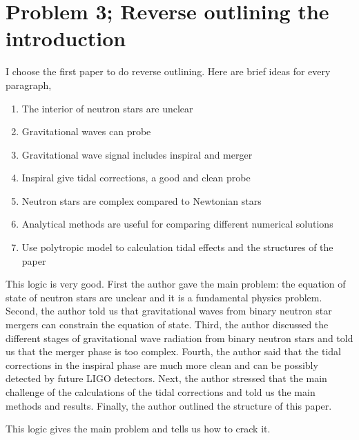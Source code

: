 \documentclass[12pt]{article}
\begin{document}
\section{Problem 3; Reverse outlining the introduction}
I choose the first paper to do reverse outlining. Here are brief ideas for every paragraph,
\begin{enumerate}
    \item The interior of neutron stars are unclear
    \item Gravitational waves can probe 
    \item Gravitational wave signal includes inspiral and merger
    \item Inspiral give tidal corrections, a good and clean probe
    \item Neutron stars are complex compared to Newtonian stars
    \item Analytical methods are useful for comparing different numerical solutions
    \item Use polytropic model to calculation tidal effects and the structures of the paper
\end{enumerate}

\quad This logic is very good. First the author gave the main problem: the equation of state of neutron stars are unclear and it is a fundamental physics problem. Second, the author told us that gravitational waves from binary neutron star mergers can constrain the equation of state. Third, the author discussed the different stages of gravitational wave radiation from binary neutron stars and told us that the merger phase is too complex. Fourth, the author said that the tidal corrections in the inspiral phase are much more clean and can be possibly detected by future LIGO detectors. Next, the author stressed that the main challenge of the calculations of the tidal corrections and told us the main methods and results. Finally, the author outlined the structure of this paper.
\newline

\quad This logic gives the main problem and tells us how to crack it.
\end{document}
